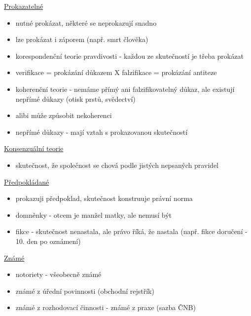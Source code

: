 \underline{Prokazatelné}
\begin{itemize}
    \item nutné prokázat, některé se neprokazují snadno
    \item lze prokázat i záporem (např. smrt člověka)
    \item korespondenční teorie pravdivosti - každou ze skutečností je třeba prokázat
    \item verifikace = prokázání důkazem X falzifikace = prokázání antiteze
    \item koherenční teorie - nemáme přímý ani falzifikovatelný důkaz, ale existují nepřímé důkazy (otisk prstů, svědectví)
    \item alibi může způsobit nekoherenci
    \item nepřímé důkazy - mají vztah s prokazovanou skutečností \\
\end{itemize}

\underline{Konsenzuální teorie}
\begin{itemize}
    \item skutečnost, že společnost se chová podle jistých nepsaných pravidel \\
\end{itemize}

\underline{Předpokládané} 
\begin{itemize}
    \item prokazuji předpoklad, skutečnost konstruuje právní norma
    \item domněnky - otcem je manžel matky, ale nemusí být
    \item fikce - skutečnost nenastala, ale právo říká, že nastala (např. fikce doručení - 10. den po oznámení) \\
\end{itemize}

\underline{Známé}
\begin{itemize}
    \item notoriety - všeobecně známé
    \item známé z úřední povinnosti (obchodní rejstřík)
    \item známé z rozhodovací činnosti - známé z praxe (sazba ČNB)
\end{itemize}
\clearpage


